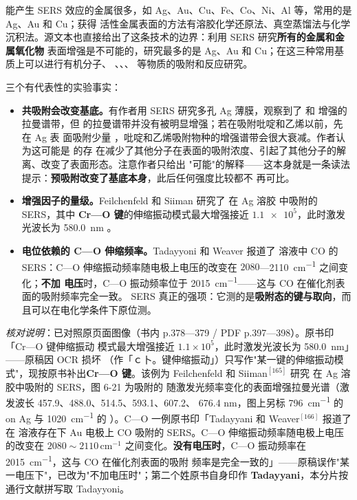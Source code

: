 能产生 SERS 效应的金属很多，如 Ag、Au、Cu、Fe、Co、Ni、Al 等，常用的是 Ag、Au 和 Cu；获得
活性金属表面的方法有溶胶化学还原法、真空蒸馏法与化学沉积法。源文本也直接给出了这条技术的边界：利用 SERS 研究\textbf{所有的金属和金属氧化物}
表面增强是不可能的，研究最多的是 Ag、Au 和 Cu；在这三种常用基质上可以进行有机分子、
、、、 等物质的吸附和反应研究。

三个有代表性的实验事实：
\begin{itemize}
\item \textbf{共吸附会改变基底。}有作者用 SERS 研究多孔 Ag 薄膜，观察到了  和 
  增强的拉曼谱带，但  的拉曼谱带并没有被明显增强；若在吸附吡啶和乙烯以前，先在 Ag 表
  面吸附少量 ，吡啶和乙烯吸附物种的增强谱带会很大衰减。作者认为这可能是  的存
  在减少了其他分子在表面的吸附浓度、引起了其他分子的解离、改变了表面形态。注意作者只给出
  "可能"的解释——这本身就是一条读法提示：\textbf{预吸附改变了基底本身}，此后任何强度比较都不
  再可比。
  \item \textbf{增强因子的量级。}Feilchenfeld 和 Siiman 研究了  在 Ag 溶胶
  中吸附的 SERS，其中 \textbf{Cr—O 键}的伸缩振动模式最大增强接近 $\num{1.1e5}$，此时激发
  光波长为 \qty{580.0}{nm}
  。
\item \textbf{电位依赖的 C—O 伸缩频率。}Tadayyoni 和 Weaver 报道了  溶液中 CO 的
  SERS：C—O 伸缩振动频率随电极上电压的改变在 $2080$—\qty{2110}{cm^{-1}} 之间变化；\textbf{不加
  电压}时，C—O 振动频率位于 \qty{2015}{cm^{-1}}——这与 CO 在催化剂表面的吸附频率完全一致。
  SERS 真正的强项：它测的是\textbf{吸附态的键与取向}，而且可以在电化学条件下原位测。
\end{itemize}

\emph{核对说明}：已对照原页面图像（书内 p.378—379 / PDF p.397—398）。原书印「Cr—O 键伸缩振动
模式最大增强接近 $1.1\times10^{5}$，此时激发光波长为 \qty{580.0}{nm}」——原稿因 OCR 损坏
（作「ｃ卜。键伸缩振动」）只写作"某一键的伸缩振动模式"，现按原书补出\textbf{Cr—O 键}。该例为
Feilchenfeld 和 Siiman$^{[165]}$ 研究  在 Ag 溶胶中吸附的 SERS，图 6-21 为吸附的
 随激发光频率变化的表面增强拉曼光谱（激发波长 457.9、488.0、514.5、593.1、607.2、
676.4 nm，图上另标 \qty{796}{cm^{-1}} 的  on Ag 与 \qty{1020}{cm^{-1}} 的
）。C—O 一例原书印「Tadayyani 和 Weaver$^{[166]}$ 报道了在  溶液存在下 Au
电极上 CO 吸附的 SERS。C—O 伸缩振动频率随电极上电压的改变在 $2080\sim2110\,\mathrm{cm^{-1}}$
之间变化。\textbf{没有电压时}，C—O 振动频率在 \qty{2015}{cm^{-1}}，这与 CO 在催化剂表面的吸附
频率是完全一致的」——原稿误作"某一电压下"，已改为"不加电压时"；第二个姓原书自身印作
\textbf{Tadayyani}，本分片按通行文献拼写取 Tadayyoni。

